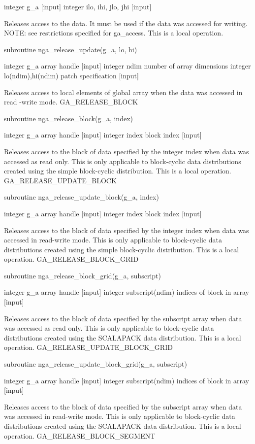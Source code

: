 integer g\_a {[}input{]} integer ilo, ihi, jlo, jhi {[}input{]}

Releases access to the data. It must be used if the data was accessed
for writing. NOTE: see restrictions specified for ga\_access. This
is a local operation.

subroutine nga\_release\_update(g\_a, lo, hi)

integer g\_a array handle {[}input{]} integer ndim number of array
dimensions integer lo(ndim),hi(ndim) patch specification {[}input{]}

Releases access to local elements of global array when the data was
accessed in read -write mode. GA\_RELEASE\_BLOCK

subroutine nga\_release\_block(g\_a, index)

integer g\_a array handle {[}input{]} integer index block index {[}input{]}

Releases access to the block of data specified by the integer index
when data was accessed as read only. This is only applicable to block-cyclic
data distributions created using the simple block-cyclic distribution.
This is a local operation. GA\_RELEASE\_UPDATE\_BLOCK

subroutine nga\_release\_update\_block(g\_a, index)

integer g\_a array handle {[}input{]} integer index block index {[}input{]}

Releases access to the block of data specified by the integer index
when data was accessed in read-write mode. This is only applicable
to block-cyclic data distributions created using the simple block-cyclic
distribution. This is a local operation. GA\_RELEASE\_BLOCK\_GRID

subroutine nga\_release\_block\_grid(g\_a, subscript)

integer g\_a array handle {[}input{]} integer subscript(ndim) indices
of block in array {[}input{]}

Releases access to the block of data specified by the subscript array
when data was accessed as read only. This is only applicable to block-cyclic
data distributions created using the SCALAPACK data distribution.
This is a local operation. GA\_RELEASE\_UPDATE\_BLOCK\_GRID

subroutine nga\_release\_update\_block\_grid(g\_a, subscript)

integer g\_a array handle {[}input{]} integer subscript(ndim) indices
of block in array {[}input{]}

Releases access to the block of data specified by the subscript array
when data was accessed in read-write mode. This is only applicable
to block-cyclic data distributions created using the SCALAPACK data
distribution. This is a local operation. GA\_RELEASE\_BLOCK\_SEGMENT

